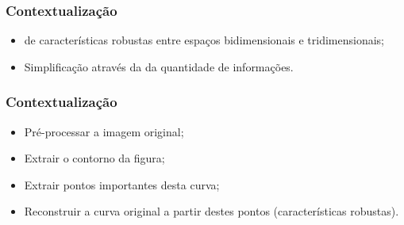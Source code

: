 \begin{frame}
\frametitle{Contextualização}

\begin{itemize}
\item {} de características robustas entre espaços bidimensionais e tridimensionais;
\item Simplificação através da  da quantidade de informações.
\end{itemize}

\end{frame}

\begin{frame}
\frametitle{Contextualização}

\medskip
\begin{itemize}
	\item Pré-processar a imagem original;
	\item Extrair o contorno da figura;
	\item Extrair pontos importantes desta curva;	
	\item Reconstruir a curva original a partir destes pontos (características robustas).
\end{itemize}

\end{frame}

